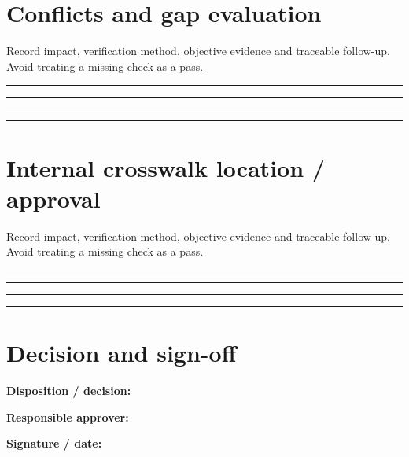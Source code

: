 \documentclass[10pt,letterpaper]{article}
\begin{document}
\section{Conflicts and gap evaluation}
Record impact, verification method, objective evidence and traceable follow-up. Avoid treating a missing check as a pass.\par\medskip
\noindent\rule{\linewidth}{0.4pt}\par\vspace{16pt}
\noindent\rule{\linewidth}{0.4pt}\par\vspace{16pt}
\noindent\rule{\linewidth}{0.4pt}\par\vspace{16pt}
\noindent\rule{\linewidth}{0.4pt}\par\vspace{16pt}
\section{Internal crosswalk location / approval}
Record impact, verification method, objective evidence and traceable follow-up. Avoid treating a missing check as a pass.\par\medskip
\noindent\rule{\linewidth}{0.4pt}\par\vspace{16pt}
\noindent\rule{\linewidth}{0.4pt}\par\vspace{16pt}
\noindent\rule{\linewidth}{0.4pt}\par\vspace{16pt}
\noindent\rule{\linewidth}{0.4pt}\par\vspace{16pt}
\section{Decision and sign-off}
\noindent\textbf{Disposition / decision:}\quad\hrulefill\par\vspace{11pt}
\noindent\textbf{Responsible approver:}\quad\hrulefill\par\vspace{11pt}
\noindent\textbf{Signature / date:}\quad\hrulefill\par\vspace{11pt}
\end{document}
